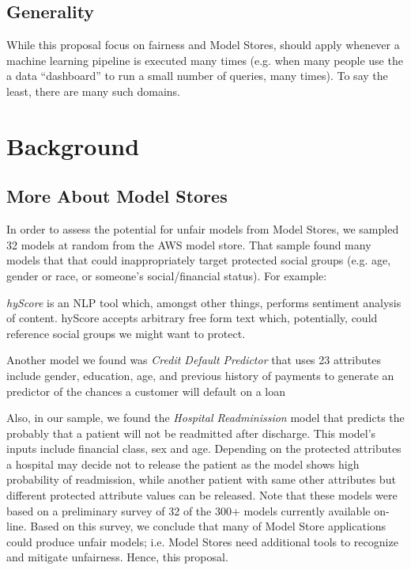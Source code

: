 \subsection{ Generality } \label{generaliaty}
While this proposal   focus  on    fairness and Model Stores,
{\IT} should apply whenever a machine learning pipeline is executed many times
(e.g. 
when  many people  use the  a data    ``dashboard'' to run a small number of queries, many times). To say the least, there are many such domains.


\section{Background}\label{tion:back}

\subsection{More About Model Stores}\label{tion:problem}
 
 In order to assess the potential for unfair models from Model Stores,  we sampled 32 models at random from
the AWS model store. 
That sample found many models that  that could   inappropriately target protected social groups (e.g. age, gender or race, or someone's social/financial status). For example:
\bi
\item
{\em hyScore} is an NLP tool which, amongst other things, performs  sentiment analysis of content. hyScore accepts arbitrary free form text which, potentially, could reference   social groups we might want to protect.
\item
Another model we found was 
{\em Credit Default Predictor} that uses   23 attributes include gender, education, age, and previous history of payments to generate an   predictor of the chances a customer will default on a loan
\item
Also, in our sample, we found the 
{\em Hospital Readminission} model that  predicts the probably that a patient will not be readmitted after discharge. This model's inputs include financial class, sex and age. Depending on the protected attributes a hospital may decide not to release the patient as the model shows high probability of readmission, while another patient with same other attributes but different protected attribute values can be released.
\ei
Note that these models  
were  based on a preliminary survey
of 32 of the 300+ models currently available on-line.
Based on this survey, we conclude that many of Model Store
applications could
 produce unfair models; i.e.  Model Stores need additional tools
to recognize
and mitigate
unfairness. Hence, this proposal.


